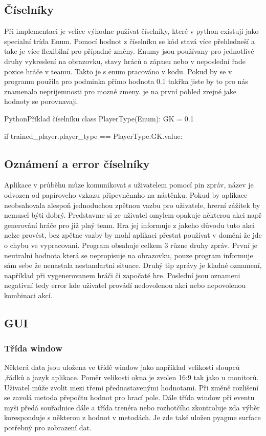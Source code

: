 \documentclass[
  program=ainfk,
  biblatex,
  language=czech,
  figures=true,
  tables ,
  sourcecodes=true,
  glossaries=true,
  index
]{kidiplom}
\begin{document}
 
\subsection{Číselníky} 
 Při implementaci je velice výhodne pužívat číselníky, které v python existují jako specialní trída Enum. Pomocí hodnot z číselníku se kód stavá více přehledneší a take je více flexibilní pro případné změny. Enumy jsou používany pro jednotlivé druhy vykreslení na obrazovku, stavy hráců a zápasu nebo v neposlední řade pozice hráče v teamu. Takto je s enum pracováno v kodu. Pokud by se v programu použila pro podminka přímo hodnota 0.1 takřka jiste by to pro nás znamenalo neprijemnosti pro mozné zmeny.  je na první pohled zrejné jake hodnoty se porovnavaji.   
 
\begin{kicode}{Python}{}{Příklad číselníku}
class PlayerType(Enum):
   GK =  0.1

if trained_player.player_type ==  PlayerType.GK.value:
\end{kicode}

 
\subsection{Oznámení a error číselníky}
 Aplikace v průběhu můze komunikovat s uživatelem pomocí pin zpráv, název je odvozen od papíroveho vzkazu připevněnnho  na nástěnku. Pokud by aplikace neobsahovala alespoň  jednoduchou zpětnou vazbu pro uživatele, hrerní zážitek by nemusel býti dobrý. Predstavme si ze uživatel omylem opakuje některou akci např generování hráče pro již plný team. Hra jej informuje z jakeho důvodu tuto akci nelze provést, bez zpětne vazby by mohl aplikaci přestat používat v doměni že jde o chybu ve vypracovani. Program obsahuje celkem 3 různe druhy zpráv. První je neutralni hodnota která se nepropisuje na obrazovku, pouze program informuje sám sebe že nenastala nestandartni situace. Druhý tip zprávy je kladné oznamení, například při vygenerovanem hráči či započaté hre. Poslední jsou oznameni negativní tedy error kde uživatel provádí nedovolenou akci nebo nepovolenou kombinaci akcí. 

 
\subsection{GUI}

\subsubsection{Třída window }
Některá data jsou uložena ve třídě window jako například velikosti sloupců ,řádků a jazyk aplikace. Poměr velikosti okna je zvolen 16:9 tak jako u monitorů. Uživatel může zvolit mezi  třemi přednastavenými hodnotami. Při změně rozlišení se zavolá metoda přepočtu hodnot pro hrací pole. Dále třída window při eventu myši předá souřadnice dále a třída trenéra nebo rozhotčího zkontroluje zda výběr koresponduje s některou z hodnot v metodách. Je zde také uložen pyagme surface potřebný pro zobrazení dat.
\end{document}
